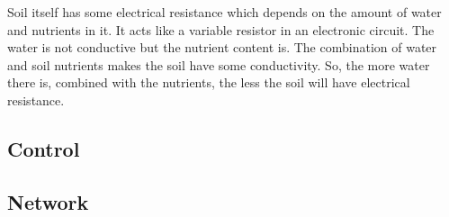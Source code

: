 Soil itself has some electrical resistance which depends on the amount of water 
and nutrients in it. It acts like a variable resistor in an electronic circuit. 
The water is not conductive but the nutrient content is. The combination of water 
and soil nutrients makes the soil have some conductivity. So, the more water there is, 
combined with the nutrients, the less the soil will have electrical resistance.


\subsection{Control}




\subsection{Network}






